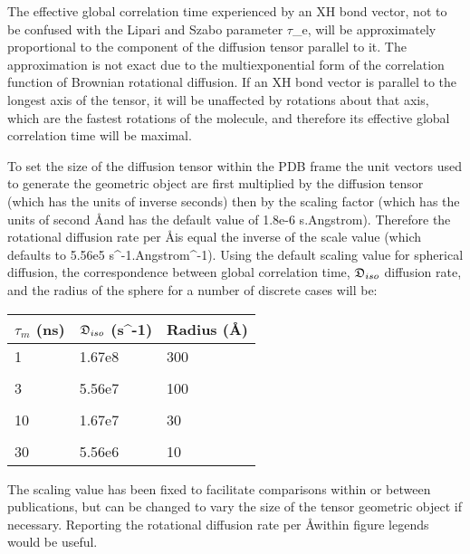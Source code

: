  The effective global correlation time experienced by an XH bond vector, not to be confused with the Lipari and Szabo parameter $\tau$\_e, will be approximately proportional to the component of the diffusion tensor parallel to it.  The approximation is not exact due to the multiexponential form of the correlation function of Brownian rotational diffusion.  If an XH bond vector is parallel to the longest axis of the tensor, it will be unaffected by rotations about that axis, which are the fastest rotations of the molecule, and therefore its effective global correlation time will be maximal. 
  

 To set the size of the diffusion tensor within the PDB frame the unit vectors used to generate the geometric object are first multiplied by the diffusion tensor (which has the units of inverse seconds) then by the scaling factor (which has the units of second \AA and has the default value of 1.8e-6 s.Angstrom).  Therefore the rotational diffusion rate per \AA is equal the inverse of the scale value (which defaults to 5.56e5 s\^{}-1.Angstrom\^{}-1).  Using the default scaling value for spherical diffusion, the correspondence between global correlation time, $\mathfrak{D}_{iso}$ diffusion rate, and the radius of the sphere for a number of discrete cases will be: 
  

 \begin{center} 
 \begin{tabular}{lll} 
 \toprule 
  $\tau_m$ (ns) & $\mathfrak{D}_{iso}$ (s\^{}-1) & Radius (\AA)  \\ 
 \midrule 
  1 & 1.67e8 & 300  \\
   &  &   \\
  3 & 5.56e7 & 100  \\
   &  &   \\
  10 & 1.67e7 & 30  \\
   &  &   \\
  30 & 5.56e6 & 10  \\
 \bottomrule 
 \end{tabular} 
 \end{center} 
  

 The scaling value has been fixed to facilitate comparisons within or between publications, but can be changed to vary the size of the tensor geometric object if necessary.  Reporting the rotational diffusion rate per \AA within figure legends would be useful. 
  

